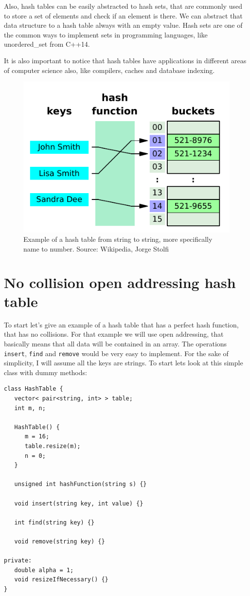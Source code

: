 \newpage

Also, hash tables can be easily abstracted to hash sets, that are commonly used to store a set of elements and check if an element is there. We can abstract that data structure to a hash table always with an empty value. Hash sets are one of the common ways to implement sets in programming languages, like unordered\_set from C++14.

It is also important to notice that hash tables have applications in different areas of computer science also, like compilers, caches and database indexing.


\begin{figure}[h!]
  \centering
  \includegraphics[width=12cm]{figuras/hash-table.pdf}
  \caption{Example of a hash table from string to string, more specifically name to number. Source: Wikipedia, Jorge Stolfi }
\end{figure}


\newpage

\section{No collision open addressing hash table }

To start let's give an example of a hash table that has a perfect hash function, that has no collisions. For that example we will use open addressing, that basically means that all data will be contained in an array. The operations \texttt{insert}, \texttt{find} and \texttt{remove} would be very easy to implement. For the sake of simplicity, I will assume all the keys are strings. To start lets look at this simple class with dummy methods:

\begin{lstlisting}
class HashTable {
   vector< pair<string, int> > table;
   int m, n;
   
   HashTable() {
      m = 16;
      table.resize(m);
      n = 0;
   }

   unsigned int hashFunction(string s) {}
   
   void insert(string key, int value) {}

   int find(string key) {}

   void remove(string key) {}

private:
   double alpha = 1;
   void resizeIfNecessary() {}
}
\end{lstlisting}

